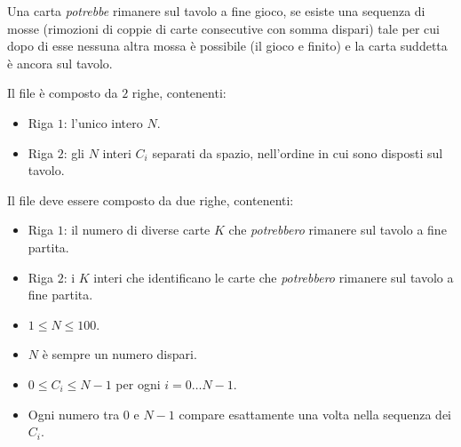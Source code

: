 \begin{warning}
	Una carta \emph{potrebbe} rimanere sul tavolo a fine gioco, se esiste una sequenza di mosse (rimozioni di coppie di carte consecutive con somma dispari) tale per cui dopo di esse nessuna altra mossa \`e possibile (il gioco e finito) e la carta suddetta \`e ancora sul tavolo.
\end{warning}




\InputFile
Il file  è composto da $2$ righe, contenenti:
\begin{itemize}[nolistsep,itemsep=2mm]
\item Riga $1$: l'unico intero $N$.
\item Riga $2$: gli $N$ interi $C_i$ separati da spazio, nell'ordine in cui sono disposti sul tavolo.
\end{itemize}


\OutputFile
Il file \outputfile{} deve essere composto da due righe, contenenti:
\begin{itemize}[nolistsep,itemsep=2mm]
\item Riga $1$: il numero di diverse carte $K$ che \emph{potrebbero} rimanere sul tavolo a fine partita.
\item Riga $2$: i $K$ interi che identificano le carte che \emph{potrebbero} rimanere sul tavolo a fine partita.
\end{itemize}
	



\Constraints

\begin{itemize}[nolistsep, itemsep=2mm]
	\item $1 \le N \le 100$.
	\item $N$ \`e sempre un numero dispari.
	\item $0 \le C_i \le N-1$ per ogni $i=0\ldots N-1$.
	\item Ogni numero tra $0$ e $N-1$ compare esattamente una volta nella sequenza dei $C_i$.
\end{itemize}



